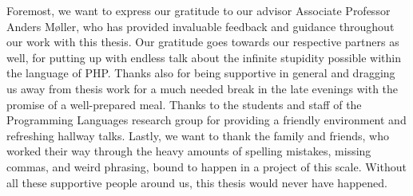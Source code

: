 Foremost, we want to express our gratitude to our advisor Associate Professor Anders Møller, who has provided invaluable feedback and guidance throughout our work with this thesis. Our gratitude goes towards our respective partners as well, for putting up with endless talk about the infinite stupidity possible within the language of PHP. Thanks also for being supportive in general and dragging us away from thesis work for a much needed break in the late evenings with the promise of a well-prepared meal. Thanks to the students and staff of the Programming Languages research group for providing a friendly environment and refreshing hallway talks. Lastly, we want to thank the family and friends, who worked their way through the heavy amounts of spelling mistakes, missing commas, and weird phrasing, bound to happen in a project of this scale. Without all these supportive people around us, this thesis would never have happened.
